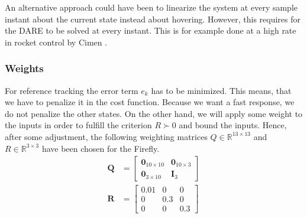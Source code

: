 \begin{remark}
An alternative approach could have been to linearize the system at every sample instant about the current state instead about hovering. However, this requires for the DARE to be solved at every instant. This is for example done at a high rate in rocket control by Cimen \cite{Cimen2008}.
\end{remark}

\subsubsection{Weights}
For reference tracking the error term $e_k$ has to be minimized. This means, that we have to penalize it in the cost function. Because we want a fast response, we do not penalize the other states. On the other hand, we will apply some weight to the inputs in order to fulfill the criterion ${R}\succ0$ and bound the inputs. Hence, after some adjustment, the following weighting matrices ${Q} \in \mathbb{R}^{13\times13}$ and ${R} \in \mathbb{R}^{3\times3}$ have been chosen for the Firefly. 
\begin{align}
\mathbf{Q} &= \begin{bmatrix}
\mathbf{0}_{10\times10} & \mathbf{0}_{10\times3} \\
\mathbf{0}_{3\times10} & \mathbf{I}_{3} 
\end{bmatrix} \\
\mathbf{R} &= \begin{bmatrix}
0.01 & 0 & 0 \\
0 & 0.3 & 0 \\
0 & 0 & 0.3
\end{bmatrix}
\end{align}





